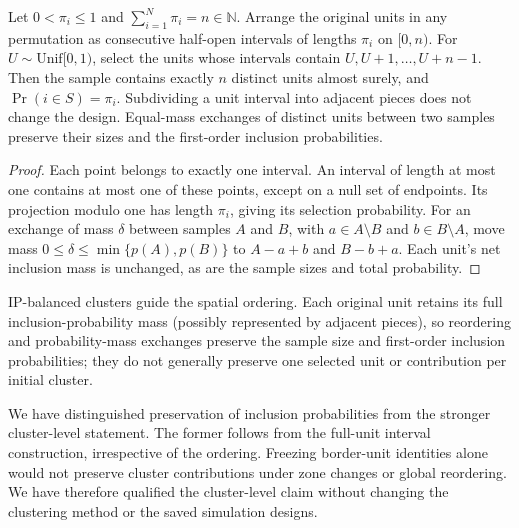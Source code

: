 \begin{proposition}
Let $0<\pi_i\leq1$ and $\sum_{i=1}^N\pi_i=n\in\mathbb{N}$.
Arrange the original units in any permutation as consecutive half-open
intervals of lengths $\pi_i$ on $[0,n)$. For $U\sim\mathrm{Unif}[0,1)$,
select the units whose intervals contain $U,U+1,\ldots,U+n-1$.
Then the sample contains exactly $n$ distinct units almost surely, and
$\Pr(i\in S)=\pi_i$. Subdividing a unit interval into adjacent pieces does
not change the design. Equal-mass exchanges of distinct units between
two samples preserve their sizes and the first-order inclusion probabilities.
\end{proposition}
\begin{proof}
Each point belongs to exactly one interval. An interval of length at
most one contains at most one of these points, except on a null set of
endpoints. Its projection modulo one has length $\pi_i$, giving its
selection probability. For an exchange of mass $\delta$ between samples
$A$ and $B$, with $a\in A\setminus B$ and $b\in B\setminus A$, move mass
$0\leq\delta\leq\min\{p(A),p(B)\}$ to $A-a+b$ and $B-b+a$. Each unit's net
inclusion mass is unchanged, as are the sample sizes and total probability.
\end{proof}

IP-balanced clusters guide the spatial ordering. Each original unit retains
its full inclusion-probability mass (possibly represented by adjacent pieces),
so reordering and probability-mass exchanges preserve the sample size and
first-order inclusion probabilities; they do not generally preserve one
selected unit or contribution per initial cluster.

We have distinguished preservation of inclusion probabilities from the
stronger cluster-level statement. The former follows from the full-unit
interval construction, irrespective of the ordering. Freezing border-unit
identities alone would not preserve cluster contributions under zone changes
or global reordering. We have therefore qualified the cluster-level claim
without changing the clustering method or the saved simulation designs.
